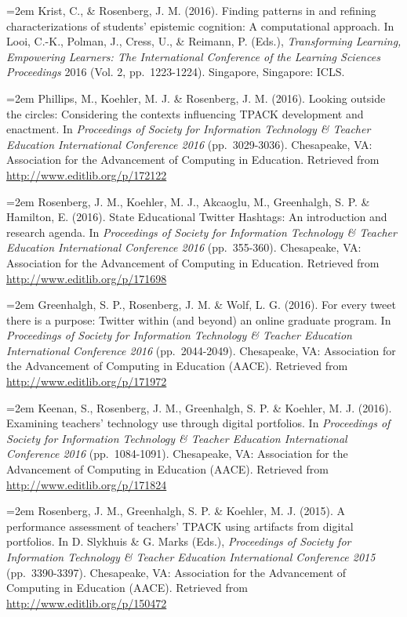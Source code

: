 \documentclass[14,]{article}
\begin{document}
\hangindent=2em Krist, C., \& Rosenberg, J. M. (2016). Finding patterns
in and refining characterizations of students' epistemic cognition: A
computational approach. In Looi, C.-K., Polman, J., Cress, U., \&
Reimann, P. (Eds.), \emph{Transforming Learning, Empowering Learners:
The International Conference of the Learning Sciences Proceedings} 2016
(Vol. 2, pp.~1223-1224). Singapore, Singapore: ICLS.

\hangindent=2em Phillips, M., Koehler, M. J. \& Rosenberg, J. M. (2016).
Looking outside the circles: Considering the contexts influencing TPACK
development and enactment. In \emph{Proceedings of Society for
Information Technology \& Teacher Education International Conference
2016} (pp.~3029-3036). Chesapeake, VA: Association for the Advancement
of Computing in Education. Retrieved from
\url{http://www.editlib.org/p/172122}

\hangindent=2em Rosenberg, J. M., Koehler, M. J., Akcaoglu, M.,
Greenhalgh, S. P. \& Hamilton, E. (2016). State Educational Twitter
Hashtags: An introduction and research agenda. In \emph{Proceedings of
Society for Information Technology \& Teacher Education International
Conference 2016} (pp.~355-360). Chesapeake, VA: Association for the
Advancement of Computing in Education. Retrieved from
\url{http://www.editlib.org/p/171698}

\hangindent=2em Greenhalgh, S. P., Rosenberg, J. M. \& Wolf, L. G.
(2016). For every tweet there is a purpose: Twitter within (and beyond)
an online graduate program. In \emph{Proceedings of Society for
Information Technology \& Teacher Education International Conference
2016} (pp.~2044-2049). Chesapeake, VA: Association for the Advancement
of Computing in Education (AACE). Retrieved from
\url{http://www.editlib.org/p/171972}

\hangindent=2em Keenan, S., Rosenberg, J. M., Greenhalgh, S. P. \&
Koehler, M. J. (2016). Examining teachers' technology use through
digital portfolios. In \emph{Proceedings of Society for Information
Technology \& Teacher Education International Conference 2016}
(pp.~1084-1091). Chesapeake, VA: Association for the Advancement of
Computing in Education (AACE). Retrieved from
\url{http://www.editlib.org/p/171824}

\hangindent=2em Rosenberg, J. M., Greenhalgh, S. P. \& Koehler, M. J.
(2015). A performance assessment of teachers' TPACK using artifacts from
digital portfolios. In D. Slykhuis \& G. Marks (Eds.), \emph{Proceedings
of Society for Information Technology \& Teacher Education International
Conference 2015} (pp.~3390-3397). Chesapeake, VA: Association for the
Advancement of Computing in Education (AACE). Retrieved from
\url{http://www.editlib.org/p/150472}
\end{document}
